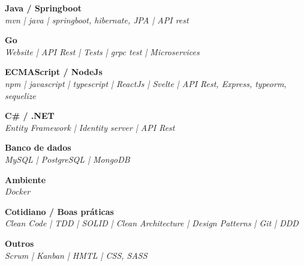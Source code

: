 \documentclass[12pt, a4paper]{article}
\begin{document}
\begin{multicols}{2}
	\begin{flushleft}
		\textbf{Java / Springboot}\\
		\textit{mvn | java | springboot, hibernate, JPA | API rest}\\
	\end{flushleft}
	\vfill
	\begin{flushleft}
		\textbf{Go}\\
		\textit{Website | API Rest | Tests | grpc test | Microservices}\\
	\end{flushleft}
\end{multicols}

\begin{multicols}{2}
	\begin{flushleft}
		\textbf{ECMAScript / NodeJs}\\
		\textit{npm | javascript | typescript | ReactJs | Svelte | API Rest, Express, typeorm, sequelize}\\
	\end{flushleft}
	\vfill
	\begin{flushleft}
		\textbf{C\# / .NET}\\
		\textit{Entity Framework | Identity server | API Rest}\\
	\end{flushleft}
\end{multicols}

\begin{multicols}{2}
	\begin{flushleft}
		\textbf{Banco de dados}\\
		\textit{MySQL | PostgreSQL | MongoDB}\\
	\end{flushleft}
	\vfill
	\begin{flushleft}
		\textbf{Ambiente}\\
		\textit{Docker}\\
	\end{flushleft}
\end{multicols}

\begin{multicols}{2}
	\begin{flushleft}
		\textbf{Cotidiano / Boas práticas}\\
		\textit{Clean Code | TDD | SOLID | Clean Architecture | Design Patterns | Git | DDD}\\
	\end{flushleft}
	\vfill
	\begin{flushleft}
		\textbf{Outros}\\
		\textit{Scrum | Kanban | HMTL | CSS, SASS}\\
	\end{flushleft}
\end{multicols}
\end{document}
